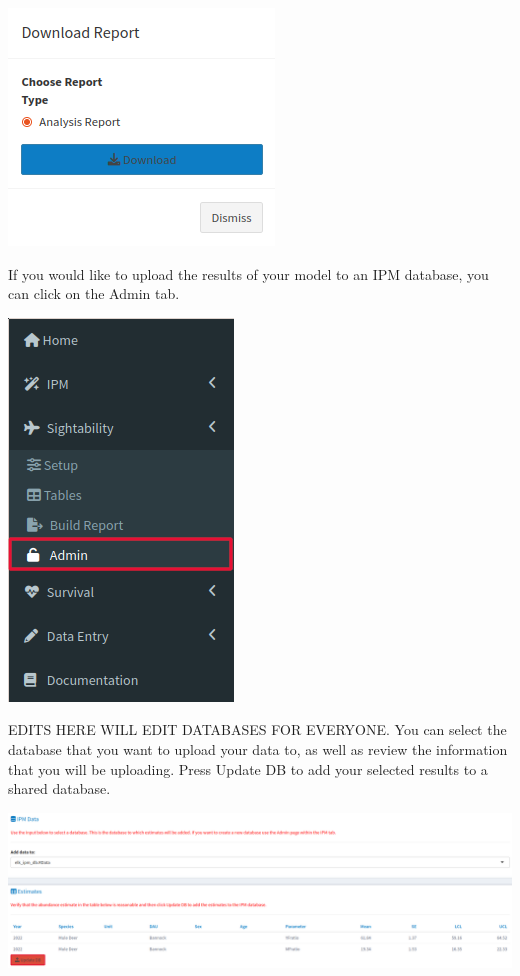 \documentclass[
]{book}
\begin{document}
\includegraphics{./www/ipm_walk9.png}

If you would like to upload the results of your model to an IPM database, you can click on the Admin tab.

\includegraphics{./www/sight_walk6.png}

EDITS HERE WILL EDIT DATABASES FOR EVERYONE. You can select the database that you want to upload your data to, as well as review the information that you will be uploading. Press {Update DB} to add your selected results to a shared database.

\includegraphics{./www/sight_walk8.png}
\end{document}

